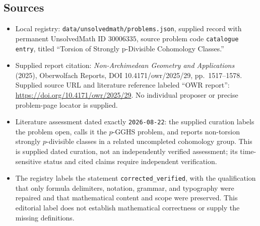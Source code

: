\documentclass[11pt]{article}
\begin{document}
\subsection{Sources}
\begin{itemize}
\item Local registry: \texttt{data/unsolvedmath/problems.json}, supplied record with permanent UnsolvedMath ID \(30006335\), source problem code \texttt{catalogue entry}, titled ``Torsion of Strongly p-Divisible Cohomology Classes.''
\item Supplied report citation: \emph{Non-Archimedean Geometry and Applications} (2025), Oberwolfach Reports, DOI 10.4171/owr/2025/29, pp.\ 1517--1578. Supplied source URL and literature reference labeled ``OWR report'': \url{https://doi.org/10.4171/owr/2025/29}. No individual proposer or precise problem-page locator is supplied.
\item Literature assessment dated exactly \texttt{2026-08-22}: the supplied curation labels the problem open, calls it the \(p\)-GGHS problem, and reports non-torsion strongly \(p\)-divisible classes in a related uncompleted cohomology group. This is supplied dated curation, not an independently verified assessment; its time-sensitive status and cited claims require independent verification.
\item The registry labels the statement \texttt{corrected\_verified}, with the qualification that only formula delimiters, notation, grammar, and typography were repaired and that mathematical content and scope were preserved. This editorial label does not establish mathematical correctness or supply the missing definitions.
\end{itemize}
\end{document}
